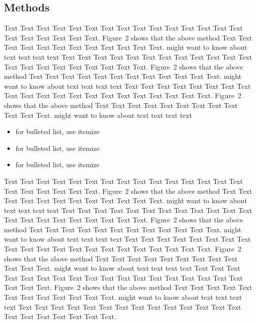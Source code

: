 \documentclass{bioinfo}
\begin{document}
    \begin{methods}
        \section{Methods}

        Text Text Text Text Text Text Text Text Text Text Text Text Text
        Text Text Text Text Text Text Text Text.
        Figure~2\vphantom{\ref{fig:02}} shows that the above method Text
        Text Text Text Text Text Text Text Text Text Text Text.
        \citealp{Boffelli03} might want to know about text text text text
        Text Text Text Text Text Text Text Text Text Text Text Text Text
        Text Text Text Text Text Text Text Text.
        Figure~2\vphantom{\ref{fig:02}} shows that the above method Text
        Text Text Text Text Text Text Text Text Text Text Text.
        \citealp{Boffelli03} might want to know about text text text text
        Text Text Text Text Text Text Text Text Text Text Text Text Text
        Text Text Text Text Text Text Text Text.
        Figure~2\vphantom{\ref{fig:02}} shows that the above method Text
        Text Text Text Text Text Text Text Text Text Text Text.
        \citealp{Boffelli03} might want to know about text text text
        text\vspace*{1pt}

        \begin{itemize}
            \item for bulleted list, use itemize
            \item for bulleted list, use itemize
            \item for bulleted list, use itemize\vspace*{1pt}
        \end{itemize}

        Text Text Text Text Text Text Text Text Text Text Text Text Text
        Text Text Text Text Text Text Text Text.
        Figure~2\vphantom{\ref{fig:02}} shows that the above method Text
        Text Text Text Text Text Text Text Text Text Text Text.
        \citealp{Boffelli03} might want to know about text text text text
        Text Text Text Text Text Text Text Text Text Text Text Text Text
        Text Text Text Text Text Text Text Text.
        Figure~2\vphantom{\ref{fig:02}} shows that the above method Text
        Text Text Text Text Text Text Text Text Text Text Text.
        \citealp{Boffelli03} might want to know about text text text text
        Text Text Text Text Text Text Text Text Text Text Text Text Text
        Text Text Text Text Text Text Text Text.
        Figure~2\vphantom{\ref{fig:02}} shows that the above method Text
        Text Text Text Text Text Text Text Text Text Text Text.
        \citealp{Boffelli03} might want to know about text text text text
        Text Text Text Text Text Text Text Text Text Text Text Text Text
        Text Text Text Text Text Text Text Text.
        Figure~2\vphantom{\ref{fig:02}} shows that the above method Text
        Text Text Text Text Text Text Text Text Text Text Text.
        \citealp{Boffelli03} might want to know about text text text text
        Text Text Text Text Text Text Text Text Text Text Text Text Text
        Text Text Text Text Text Text Text Text.


\end{methods}
\end{document}
